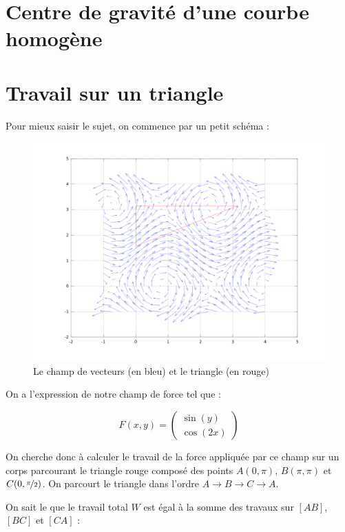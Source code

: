 \documentclass[a4paper, 11pt]{report} %
\begin{document}
\section{Centre de gravité d'une courbe homogène} %


\section{Travail sur un triangle} %

Pour mieux saisir le sujet, on commence par un petit schéma :

\begin{figure}[!h]
    \includegraphics[width=15cm]{exo4.png}
    \caption{\label{fig_exo4} Le champ de vecteurs (en bleu) et le triangle (en rouge)}
\end{figure}

On a l'expression de notre champ de force tel que :

\[
F(x, y) =
\begin{pmatrix}
\sin(y)\\
\cos(2x)
\end{pmatrix}
\]

On cherche donc à calculer le travail de la force appliquée par ce champ sur un corps parcourant le triangle rouge
composé des points $A(0, \pi)$, $B(\pi,\pi)$ et $C(0,\nicefrac{\pi}{2})$. On parcourt le triangle dans l'ordre $A
\rightarrow B \rightarrow C \rightarrow A$.

On sait le que le travail total $W$ est égal à la somme des travaux sur $[AB]$, $[BC]$ et $[CA]$ :
\end{document}
